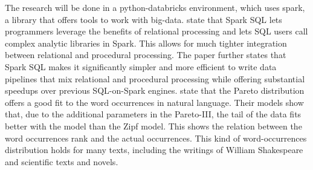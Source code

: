 \documentclass[../../Thesis.tex]{subfiles}
\begin{document}
The research will be done in a python-databricks environment, which uses spark, a library that offers tools to work with big-data. \citet{armbrust2015spark} state that Spark SQL lets programmers leverage the benefits of relational processing and lets SQL users call complex analytic libraries in Spark. This allows for much tighter integration between relational and procedural processing. The paper further states that Spark SQL makes it significantly simpler and more efficient to write data pipelines that mix relational and procedural processing while offering substantial speedups over previous SQL-on-Spark engines.
\citet{wiegand2018word} state that the Pareto distribution offers a good fit to the word occurrences in natural language. Their models show that, due to the additional parameters in the Pareto-III, the tail of the data fits better with the model than the Zipf model. This shows the relation between the word occurrences rank and the actual occurrences. This kind of word-occurrences distribution holds for many texts, including the writings of William Shakespeare and scientific texts and novels\cite{thurner2015understanding}.
\end{document}
